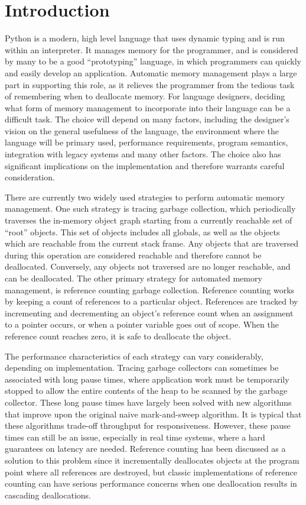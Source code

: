 \documentclass{sigplanconf}
\begin{document}
\section{Introduction}

Python is a modern, high level language that uses dynamic typing and is run within an interpreter.  It manages memory for the programmer, and is considered by many to be a good ``prototyping'' language, in which programmers can quickly and easily develop an application.   Automatic memory management plays a large part in supporting this role, as it relieves the programmer from the tedious task of remembering when to deallocate memory.  For language designers, deciding what form of memory management to incorporate into their language can be a difficult task.  The choice will depend on many factors, including the designer's vision on the general usefulness of the language, the environment where the language will be primary used, performance requirements, program semantics, integration with legacy systems and many other factors.  The choice also has significant implications on the implementation and therefore warrants careful consideration.  

There are currently two widely used strategies to perform automatic memory management.  One such strategy is tracing garbage collection, which periodically traverses the in-memory object graph starting from a currently reachable set of ``root'' objects.  This set of objects includes all globals, as well as the objects which are reachable from the current stack frame.  Any objects that are traversed during this operation are considered reachable and therefore cannot be deallocated.  Conversely, any objects not traversed are no longer reachable, and can be deallocated.  The other primary strategy for automated memory management, is reference counting garbage collection. Reference counting works by keeping a count of references to a particular object.  References are tracked by incrementing and decrementing an object's reference count when an assignment to a pointer occurs, or when a pointer variable goes out of scope.  When the reference count reaches zero, it is safe to deallocate the object.

The performance characteristics of each strategy can vary considerably, depending on implementation.   Tracing garbage collectors can sometimes be associated with long pause times, where application work must be temporarily stopped to allow the entire contents of the heap to be scanned by the garbage collector.  These long pause times have largely been solved with new algorithms that improve upon the original naive mark-and-sweep algorithm.  It is typical that these algorithms trade-off throughput for responsiveness.  However, these pause times can still be an issue, especially in real time systems, where a hard guarantees on latency are needed.  Reference counting has been discussed as a solution to this problem since it incrementally deallocates objects at the program point where all references are destroyed, but classic implementations of reference counting can have serious performance concerns when one deallocation results in cascading deallocations\cite{boehm}.  
\end{document}
